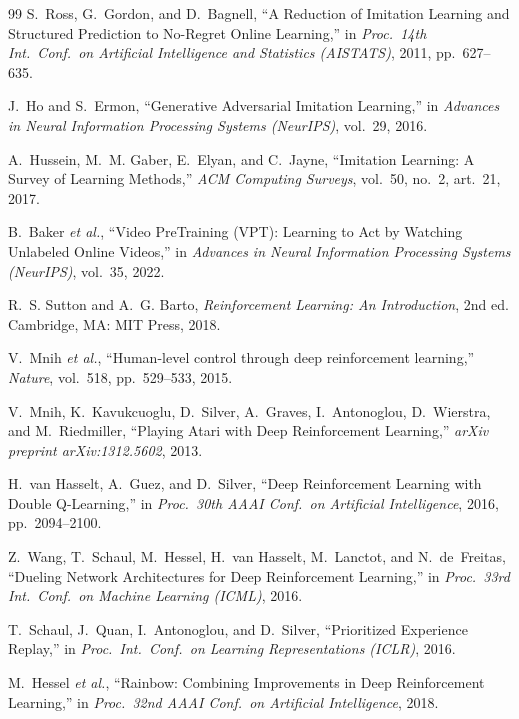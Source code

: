 \begin{thebibliography}{99}
S.~Ross, G.~Gordon, and D.~Bagnell,
``A Reduction of Imitation Learning and Structured Prediction to No-Regret
Online Learning,''
in \emph{Proc.\ 14th Int.\ Conf.\ on Artificial Intelligence and Statistics
(AISTATS)}, 2011, pp.~627--635.

J.~Ho and S.~Ermon,
``Generative Adversarial Imitation Learning,''
in \emph{Advances in Neural Information Processing Systems (NeurIPS)},
vol.~29, 2016.

A.~Hussein, M.~M. Gaber, E.~Elyan, and C.~Jayne,
``Imitation Learning: A Survey of Learning Methods,''
\emph{ACM Computing Surveys}, vol.~50, no.~2, art.~21, 2017.

B.~Baker \emph{et al.},
``Video PreTraining (VPT): Learning to Act by Watching Unlabeled Online
Videos,''
in \emph{Advances in Neural Information Processing Systems (NeurIPS)},
vol.~35, 2022.


R.~S. Sutton and A.~G. Barto,
\emph{Reinforcement Learning: An Introduction}, 2nd ed.
Cambridge, MA: MIT Press, 2018.

V.~Mnih \emph{et al.},
``Human-level control through deep reinforcement learning,''
\emph{Nature}, vol.~518, pp.~529--533, 2015.

V.~Mnih, K.~Kavukcuoglu, D.~Silver, A.~Graves, I.~Antonoglou, D.~Wierstra,
and M.~Riedmiller,
``Playing Atari with Deep Reinforcement Learning,''
\emph{arXiv preprint arXiv:1312.5602}, 2013.

H.~van Hasselt, A.~Guez, and D.~Silver,
``Deep Reinforcement Learning with Double Q-Learning,''
in \emph{Proc.\ 30th AAAI Conf.\ on Artificial Intelligence}, 2016,
pp.~2094--2100.

Z.~Wang, T.~Schaul, M.~Hessel, H.~van Hasselt, M.~Lanctot, and N.~de~Freitas,
``Dueling Network Architectures for Deep Reinforcement Learning,''
in \emph{Proc.\ 33rd Int.\ Conf.\ on Machine Learning (ICML)}, 2016.

T.~Schaul, J.~Quan, I.~Antonoglou, and D.~Silver,
``Prioritized Experience Replay,''
in \emph{Proc.\ Int.\ Conf.\ on Learning Representations (ICLR)}, 2016.

M.~Hessel \emph{et al.},
``Rainbow: Combining Improvements in Deep Reinforcement Learning,''
in \emph{Proc.\ 32nd AAAI Conf.\ on Artificial Intelligence}, 2018.


\end{thebibliography}
